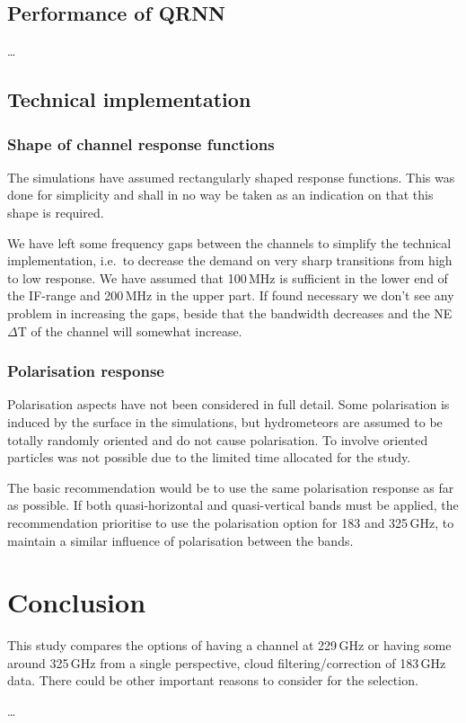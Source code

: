 \documentclass[12pt]{article}
\begin{document}
\subsection{Performance of QRNN}
%
\dots

\subsection{Technical implementation}

\subsubsection{Shape of channel response functions}
%
The simulations have assumed rectangularly shaped response functions. This was
done for simplicity and shall in no way be taken as an indication on that this
shape is required.

We have left some frequency gaps between the channels to simplify the technical
implementation, i.e.\ to decrease the demand on very sharp transitions from high
to low response. We have assumed that 100\,MHz is sufficient in the lower end
of the IF-range and 200\,MHz in the upper part. If found necessary we don't see
any problem in increasing the gaps, beside that the bandwidth decreases and the
NE$\Delta$T of the channel will somewhat increase.


\subsubsection{Polarisation response}
%
Polarisation aspects have not been considered in full detail. Some polarisation
is induced by the surface in the simulations, but hydrometeors are assumed to
be totally randomly oriented and do not cause polarisation. To involve oriented
particles was not possible due to the limited time allocated for the study.

The basic recommendation would be to use the same polarisation response as far
as possible. If both quasi-horizontal and quasi-vertical bands must be applied,
the recommendation prioritise to use the polarisation option for 183 and
325\,GHz, to maintain a similar influence of polarisation between the bands.


\section{Conclusion}
%
This study compares the options of having a channel at 229\,GHz or having some
around 325\,GHz from a single perspective, cloud filtering/correction of
183\,GHz data. There could be other important reasons to consider for the
selection.

\dots


{\footnotesize

}
\end{document}
